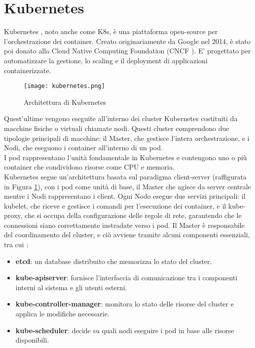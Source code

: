 \section{Kubernetes}
Kubernetes \cite{kubernetes}, noto anche come K8s, è una piattaforma open-source per l'orchestrazione dei container.
Creato originariamente da Google nel 2014, è stato poi donato alla Cloud Native Computing Foundation (CNCF \cite{cncf}).
E' progettato per automatizzare la gestione, lo scaling e il deployment di applicazioni containerizzate.
\begin{figure}[h]
    \centering
   \texttt{[image: kubernetes.png]}
    \caption{Architettura di Kubernetes \cite{kubeart}}
    \label{fig:kube}
\end{figure}
Quest'ultime vengono eseguite all'interno dei cluster Kubernetes costituiti da macchine fisiche o virtuali chiamate nodi. 
Questi cluster comprendono due tipologie principali di macchine: il Master, che gestisce l'intera orchestrazione, e i Nodi, che eseguono i container all'interno di un pod.
\\I pod rappresentano l'unità fondamentale in Kubernetes e contengono uno o più container che condividono risorse come CPU e memoria.
\\Kubernetes segue un'architettura basata sul paradigma client-server (raffigurata in Figura \ref{fig:kube}), con i pod come unità di base, il Master che agisce da server centrale mentre i Nodi rappresentano i client. 
Ogni Nodo esegue due servizi principali: il kubelet, che riceve e gestisce i comandi per l'esecuzione dei container, 
e il kube-proxy, che si occupa della configurazione delle regole di rete, garantendo che le connessioni siano correttamente instradate verso i pod.
Il Master è responsabile del coordinamento del cluster, e ciò avviene tramite alcuni componenti essenziali, tra cui \cite{kubeart}:
\begin{itemize}
    \item \textbf{etcd}: un database distribuito che memorizza lo stato del cluster.
    \item \textbf{kube-apiserver}: fornisce l'interfaccia di comunicazione tra i componenti interni al sistema e gli utenti esterni.
    \item \textbf{kube-controller-manager}: monitora lo stato delle risorse del cluster e applica le modifiche necessarie.
    \item \textbf{kube-scheduler}: decide su quali nodi eseguire i pod in base alle risorse disponibili.
\end{itemize}
